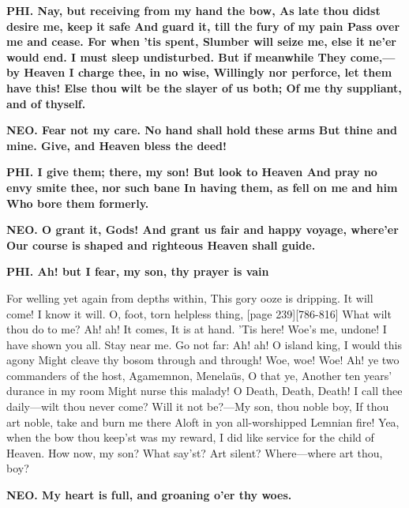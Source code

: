 \documentclass[11pt,letter]{book}
\begin{document}
\par \textbf{PHI. Nay, but receiving from my hand the bow, As late thou didst desire me, keep it safe And guard it, till the fury of my pain Pass over me and cease. For when ’tis spent, Slumber will seize me, else it ne’er would end. I must sleep undisturbed. But if meanwhile They come,—by Heaven I charge thee, in no wise, Willingly nor perforce, let them have this! Else thou wilt be the slayer of us both; Of me thy suppliant, and of thyself.}
\par 

\par \textbf{NEO. Fear not my care. No hand shall hold these arms But thine and mine. Give, and Heaven bless the deed!}
\par 

\par \textbf{PHI. I give them; there, my son! But look to Heaven And pray no envy smite thee, nor such bane In having them, as fell on me and him Who bore them formerly.}
\par 

\par \textbf{NEO. O grant it, Gods! And grant us fair and happy voyage, where’er Our course is shaped and righteous Heaven shall guide.}
\par 

\par \textbf{PHI. Ah! but I fear, my son, thy prayer is vain}
\par   For welling yet again from depths within, This gory ooze is dripping. It will come! I know it will. O, foot, torn helpless thing, [page 239][786-816] What wilt thou do to me? Ah! ah! It comes, It is at hand. ’Tis here! Woe’s me, undone! I have shown you all. Stay near me. Go not far:  Ah! ah! O island king, I would this agony Might cleave thy bosom through and through! Woe, woe! Woe! Ah! ye two commanders of the host, Agamemnon, Menelaüs, O that ye, Another ten years’ durance in my room Might nurse this malady! O Death, Death, Death! I call thee daily—wilt thou never come? Will it not be?—My son, thou noble boy, If thou art noble, take and burn me there Aloft in yon all-worshipped Lemnian fire! Yea, when the bow thou keep’st was my reward, I did like service for the child of Heaven. How now, my son? What say’st? Art silent? Where—where art thou, boy?

\par \textbf{NEO. My heart is full, and groaning o’er thy woes.}
\par 
\end{document}
